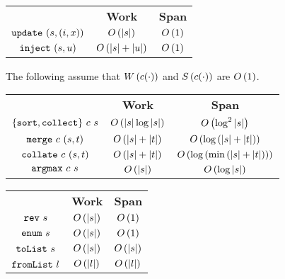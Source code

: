 \begin{costspec}[Updates]
\begin{tabular}{c|c|c}
& \textbf{Work} & \textbf{Span} \\
%
$\texttt{update}~(s,(i,x))$ &
$O\left({|s|}\right)$ &
$O\left({1}\right)$ \\
%
$\texttt{inject}~(s,u)$ &
$O\left({|s| + |u|}\right)$ &
$O\left({1}\right)$ \\
%
\end{tabular}
\end{costspec}

\begin{costspec}
The following assume that $W\left({c(\cdot)}\right)$ and $S\left({c(\cdot)}\right)$ are $O\left({1}\right)$.
\begin{tabular}{c|c|c}
& \textbf{Work} & \textbf{Span} \\
%
$\{\texttt{sort},\texttt{collect}\}~c~s$ &
$\displaystyle O\left({|s|\log{|s|}}\right)$ &
$\displaystyle O\left({\log^2{|s|}}\right)$ \\
%
$\texttt{merge}~c~(s,t)$ &
$\displaystyle O\left({|s| + |t|}\right)$ &
$\displaystyle O\left({\log\left(|s| + |t|\right)}\right)$ \\
%
$\texttt{collate}~c~(s,t)$ &
$\displaystyle O\left({|s| + |t|}\right)$ &
$\displaystyle O\left({\log\left(\min\left(|s| + |t|\right)\right)}\right)$ \\
%
$\texttt{argmax}~c~s$ &
$\displaystyle O\left({|s|}\right)$ &
$\displaystyle O\left({\log{|s|}}\right)$ \\
%
\end{tabular}
\end{costspec}

\begin{costspec}[Miscellaneous]
\begin{tabular}{c|c|c}
& \textbf{Work} & \textbf{Span} \\
%
$\texttt{rev}~s$ &
$\displaystyle O\left({|s|}\right)$ &
$\displaystyle O\left({1}\right)$ \\
%
$\texttt{enum}~s$ &
$\displaystyle O\left({|s|}\right)$ &
$\displaystyle O\left({1}\right)$ \\
%
$\texttt{toList}~s$ &
$O\left({|s|}\right)$ &
$O\left({|s|}\right)$ \\
%
$\texttt{fromList}~l$ &
$O\left({|l|}\right)$ &
$O\left({|l|}\right)$ \\
%
\end{tabular}
\end{costspec}

